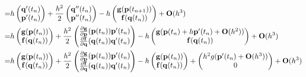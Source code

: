 \begin{solution}
\begin{enumerate}[(a)]
\begin{align*}
      = & h
      \begin{pmatrix}
        \mb q'(t_n) \\
        \mb p'(t_n)
      \end{pmatrix} + \frac{h^2}{2}
      \begin{pmatrix}
        \mb q''(t_n) \\
        \mb p''(t_n)
      \end{pmatrix} - h
      \begin{pmatrix}
        \mb g(\mb p(t_{n+1})) \\
        \mb f(\mb q(t_n))
      \end{pmatrix} + \mb O(h^3) \\
      = & h
      \begin{pmatrix}
        \mb g(\mb p(t_n)) \\
        \mb f(\mb q(t_n))
      \end{pmatrix} + \frac{h^2}{2}
      \begin{pmatrix}
        \frac{\partial \mb g}{\partial \mb p}(\mb p(t_n))\mb p'(t_n) \\
        \frac{\partial \mb f}{\partial \mb q}(\mb q(t_n))\mb q'(t_n)
      \end{pmatrix} - h
      \begin{pmatrix}
        \mb g(\mb p(t_n) + h \mb p'(t_n) + \mb O(h^2)) \\
        \mb f(\mb q(t_n))
      \end{pmatrix} + \mb O(h^3) \\
      = & h
      \begin{pmatrix}
        \mb g(\mb p(t_n)) \\
        \mb f(\mb q(t_n))
      \end{pmatrix} + \frac{h^2}{2}
      \begin{pmatrix}
        \frac{\partial \mb g}{\partial \mb p}(\mb p(t_n))\mb p'(t_n) \\
        \frac{\partial \mb f}{\partial \mb q}(\mb q(t_n))\mb q'(t_n)
      \end{pmatrix} - h
      \begin{pmatrix}
        \mb g(\mb p(t_n)) \\
        \mb f(\mb q(t_n))
      \end{pmatrix} + 
      \begin{pmatrix}
        h^2 g(\mb p'(t_n) + \mb O(h^3)) \\
        0
      \end{pmatrix} +
      \mb O(h^3) \\

\end{align*}
\end{enumerate}
\end{solution}
